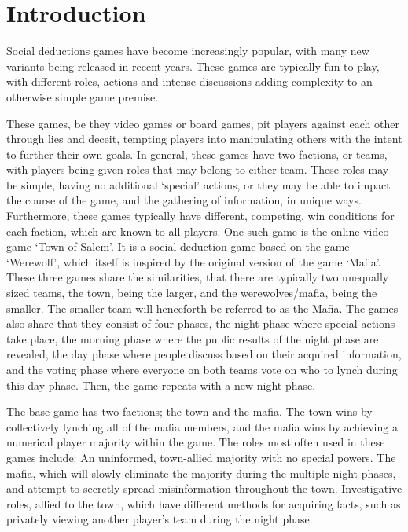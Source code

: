 \section{Introduction}
Social deductions games have become increasingly popular, with many new 
variants being released in recent years. These games are typically fun to play, 
with different roles, actions and intense discussions adding complexity to an 
otherwise simple game premise. 

These games, be they video games or board games, pit players against each other 
through lies and deceit, tempting players into manipulating others with the 
intent to further their own goals. In general, these games have two factions, 
or teams, with players being given roles that may belong to either team. These 
roles may be simple, having no additional ‘special’ actions, or they may be 
able to impact the course of the game, and the gathering of information, in 
unique ways. Furthermore, these games typically have different, competing, win 
conditions for each faction, which are known to all players. One such game is 
the online video game ‘Town of Salem’. It is a social deduction game based on 
the game ‘Werewolf’, which itself is inspired by the original version of the 
game ‘Mafia’. These three games share the similarities, that there are 
typically two unequally sized teams, the town, being the larger, and the 
werewolves/mafia, being the smaller. The smaller team will henceforth be 
referred to as the Mafia. The games also share that they consist of four 
phases, the night phase where special actions take place, the morning phase 
where the public results of the night phase are revealed, the day phase where 
people discuss based on their acquired information, and the voting phase where 
everyone on both teams vote on who to lynch during this day phase. Then, the 
game repeats with a new night phase. 

The base game has two factions; the town and the mafia. The town wins by 
collectively lynching all of the mafia members, and the mafia wins by achieving 
a numerical player majority within the game. The roles most often used in these 
games include: An uninformed, town-allied majority with no special powers. The 
mafia, which will slowly eliminate the majority during the multiple night 
phases, and attempt to secretly spread misinformation throughout the town. 
Investigative roles, allied to the town, which have different methods for 
acquiring facts, such as privately viewing another player’s team during the 
night phase. 

